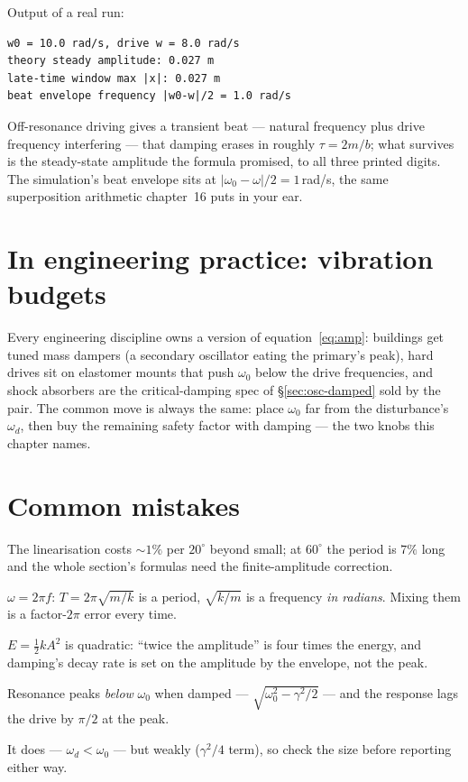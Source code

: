 Output of a real run:
\begin{lstlisting}[numbers=none]
w0 = 10.0 rad/s, drive w = 8.0 rad/s
theory steady amplitude: 0.027 m
late-time window max |x|: 0.027 m
beat envelope frequency |w0-w|/2 = 1.0 rad/s
\end{lstlisting}

Off-resonance driving gives a transient beat --- natural frequency
plus drive frequency interfering --- that damping erases in roughly
$\tau=2m/b$; what survives is the steady-state amplitude the formula
promised, to all three printed digits. The simulation's beat
envelope sits at $|\omega_0-\omega|/2=1$\,rad/s, the same
superposition arithmetic chapter~16 puts in your ear.

\section{In engineering practice: vibration budgets}\label{sec:osc-eng}

Every engineering discipline owns a version of equation~\eqref{eq:amp}:
buildings get tuned mass dampers (a secondary oscillator eating the
primary's peak), hard drives sit on elastomer mounts that push
$\omega_0$ below the drive frequencies, and shock absorbers are the
critical-damping spec of \S\ref{sec:osc-damped} sold by the pair. The
common move is always the same: place $\omega_0$ far from the
disturbance's $\omega_d$, then buy the remaining safety factor with
damping --- the two knobs this chapter names.

\section{Common mistakes}\label{sec:osc-mistakes}

\begin{tripwire}
The linearisation costs $\sim1\%$ per $20^{\circ}$ beyond small; at
$60^{\circ}$ the period is $7\%$ long and the whole section's formulas
need the finite-amplitude correction.
\end{tripwire}
\begin{tripwire}[$\omega$ vs $f$]
$\omega=2\pi f$: $T=2\pi\sqrt{m/k}$ is a period, $\sqrt{k/m}$ is a
frequency \emph{in radians}. Mixing them is a factor-$2\pi$ error every
time.
\end{tripwire}
\begin{tripwire}
$E=\tfrac12kA^{2}$ is quadratic: ``twice the amplitude'' is four times
the energy, and damping's decay rate is set on the amplitude by the
envelope, not the peak.
\end{tripwire}
\begin{tripwire}
Resonance peaks \emph{below} $\omega_0$ when damped ---
$\sqrt{\omega_0^{2}-\gamma^{2}/2}$ --- and the response lags the drive by
$\pi/2$ at the peak.
\end{tripwire}
\begin{tripwire}
It does --- $\omega_d<\omega_0$ --- but weakly ($\gamma^{2}/4$ term), so
check the size before reporting either way.
\end{tripwire}

